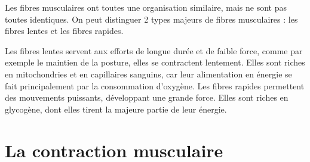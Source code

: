 Les fibres musculaires ont toutes une organisation similaire, mais ne sont pas toutes identiques. 
On peut distinguer 2 types majeurs de fibres musculaires : les fibres lentes et les fibres rapides. 

Les fibres lentes servent aux efforts de longue durée et de faible force, comme par exemple le maintien de la posture, elles se contractent lentement. 
Elles sont riches en mitochondries et en capillaires sanguins, car leur alimentation en énergie se fait principalement par la consommation d'oxygène. 
Les fibres rapides permettent des mouvements puissants, développant une grande force. Elles sont riches en glycogène, dont elles tirent la majeure partie de leur énergie. 






\section{La contraction musculaire}

